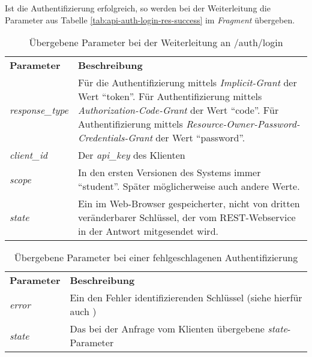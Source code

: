 Ist die Authentifizierung erfolgreich, so werden bei der Weiterleitung die Parameter aus Tabelle \ref{tab:api-auth-login-res-success} im \textit{Fragment} übergeben.
\begin{table}
	\begin{tabular}{@{} | p{.2\linewidth} | p{.75\linewidth} | @{}}
		\hline
		\textbf{Parameter} & \textbf{Beschreibung}\\ \hhline{|=|=|}
		\textit{response\_type} & Für die Authentifizierung mittels \textit{Implicit-Grant} der Wert \enquote{token}. Für Authentifizierung mittels \textit{Authorization-Code-Grant} der Wert \enquote{code}. Für Authentifizierung mittels \textit{Resource-Owner-Password-Credentials-Grant} der Wert \enquote{password}. \\ \hline
		\textit{client\_id} & Der \textit{api\_key} des Klienten \\ \hline
		\textit{scope} & In den ersten Versionen des Systems immer \enquote{student}. Später möglicherweise auch andere Werte. \\ \hline
		\textit{state} & Ein im Web-Browser gespeicherter, nicht von dritten veränderbarer Schlüssel, der vom REST-Webservice in der Antwort mitgesendet wird.\\
		\hline
	\end{tabular}
	\caption{Übergebene Parameter bei der Weiterleitung an /auth/login}
	\label{tab:api-auth-login-req-params}
\end{table}

\begin{table}
	\begin{tabular}{@{} | p{.2\linewidth} | p{.75\linewidth} | @{}}
		\hline
		\textbf{Parameter} & \textbf{Beschreibung}\\ \hhline{|=|=|}
		\textit{error} & Ein den Fehler identifizierenden Schlüssel (siehe hierfür auch \cite[Kap. 4.2.2.1]{rfc6749})\\ \hline
		\textit{state} & Das bei der Anfrage vom Klienten übergebene \textit{state}-Parameter\\
		\hline
	\end{tabular}
	\caption{Übergebene Parameter bei einer fehlgeschlagenen Authentifizierung}
	\label{tab:api-auth-login-res-error}
\end{table}

